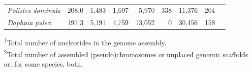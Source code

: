 \begin{table}[t]
\begin{tabularx}{\textwidth}{lrrrrrrrr}
\textit{Polistes dominula}          &                  208.0 &                     1,483 &        1,697 &        5,970 &          338 &       11,376 &          204   \\
\textit{Daphnia pulex}              &                  197.3 &                     5,191 &        4,759 &       13,052 &            0 &       30,456 &          158   \\ \hline
\end{tabularx}
\raggedright
{\scriptsize
\textsuperscript{1}Total number of nucleotides in the genome assembly. \\
\textsuperscript{2}Total number of assembled (pseudo)chromosomes or unplaced genomic scaffolds or, for some species, both. \\
}
\end{table}

